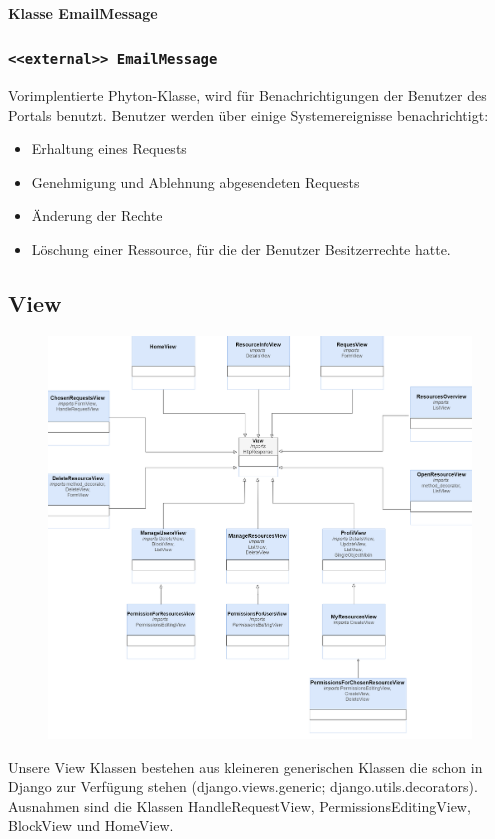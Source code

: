 \documentclass[parskip=full,11pt]{scrartcl}
\newcommand{\class}[1]{\subsubsection*{\lstinline[basicstyle=\ttfamily\large]{#1}}}
\begin{document}
 
 
  \paragraph*{Klasse EmailMessage}
 \class{<<external>> EmailMessage}
 Vorimplentierte Phyton-Klasse, wird für Benachrichtigungen der Benutzer des Portals benutzt. Benutzer werden über einige Systemereignisse benachrichtigt:
 \begin{itemize}
	\item Erhaltung eines Requests
	\item Genehmigung und Ablehnung abgesendeten Requests
	\item Änderung der Rechte
	\item Löschung einer Ressource, für die der Benutzer Besitzerrechte hatte.
\end{itemize}
\newpage 
\subsection{View}
\begin{figure}[ht!]
	\centering
	\includegraphics[width=\textwidth]{res/views}
	\label{Views-Klassendiagramm}
\end{figure}

Unsere View Klassen bestehen aus kleineren generischen Klassen die schon in Django zur Verfügung stehen (django.views.generic; django.utils.decorators). Ausnahmen sind die Klassen HandleRequestView, PermissionsEditingView, BlockView und HomeView.
\end{document}
